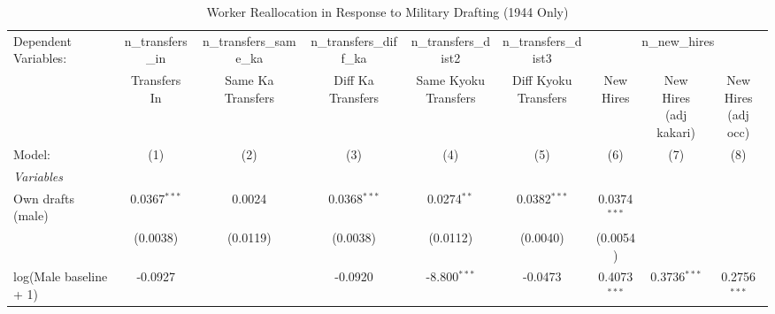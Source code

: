\begin{table}[htbp]
\centering
\caption{Worker Reallocation in Response to Military Drafting (1944 Only)}
\label{tab:reallocation-1944}
\small
\begin{threeparttable}
\begingroup
\centering
\begin{tabular}{lcccccccc}
   \tabularnewline \midrule \midrule
   Dependent Variables: & n\_transfers\_in & n\_transfers\_same\_ka & n\_transfers\_diff\_ka & n\_transfers\_dist2 & n\_transfers\_dist3 & \multicolumn{3}{c}{n\_new\_hires}\\
                                       & \makecell{Transfers\\In}    & \makecell{Same Ka\\Transfers}    & \makecell{Diff Ka\\Transfers}    & \makecell{Same Kyoku\\Transfers}    & \makecell{Diff Kyoku\\Transfers}    & \makecell{New\\Hires}    & \makecell{New Hires\\(adj kakari)}    & \makecell{New Hires\\(adj occ)} \\      
   Model:                              & (1)                         & (2)                              & (3)                              & (4)                                 & (5)                                 & (6)                      & (7)                                   & (8)\\  
   \midrule
   \emph{Variables}\\
   Own drafts (male)                   & 0.0367$^{***}$              & 0.0024                           & 0.0368$^{***}$                   & 0.0274$^{**}$                       & 0.0382$^{***}$                      & 0.0374$^{***}$           &                                       &   \\   
                                       & (0.0038)                    & (0.0119)                         & (0.0038)                         & (0.0112)                            & (0.0040)                            & (0.0054)                 &                                       &   \\   
   log(Male baseline + 1)              & -0.0927                     &                                  & -0.0920                          & -8.800$^{***}$                      & -0.0473                             & 0.4073$^{***}$           & 0.3736$^{***}$                        & 0.2756$^{***}$\\   

\end{tabular}
\end{threeparttable}
\end{table}
